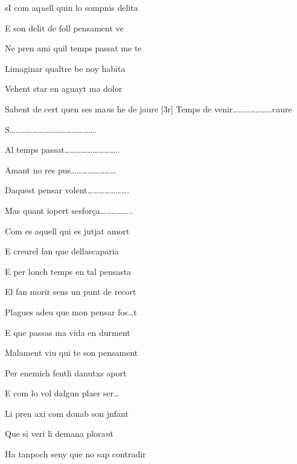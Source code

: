 





\begin{estrofa}

 sI com aq\textit{ue}ll quin lo sompnis delita

 E son delit de foll pensament ve

 Ne pren ami quil temps passat me te

 Limaginar qualtre be noy habita

 Vehent star en aguayt ma dolor

 Sabent de cert quen ses ma\textit{n}s he de jaure
[3r]
 Temps de venir\ldots{}\ldots{}\ldots{}\ldots{}\ldots{}\ldots{}\ldots{}caure

 S\ldots{}\ldots{}\ldots{}\ldots{}\ldots{}\ldots{}\ldots{}\ldots{}\ldots{}\ldots{}\ldots{}\ldots{}\ldots{}\ldots{}\ldots{}.

\end{estrofa}



\begin{estrofa}

 Al temps passat\ldots{}\ldots{}\ldots{}\ldots{}\ldots{}\ldots{}\ldots{}\ldots{}\ldots{}..

 Amant no res pus\ldots{}\ldots{}\ldots{}\ldots{}\ldots{}\ldots{}\ldots{}\ldots{}

 Daquest pensar volent\ldots{}\ldots{}\ldots{}\ldots{}\ldots{}\ldots{}\ldots{}.

 Mas quant iopert sesfor\c{c}a\ldots{}\ldots{}\ldots{}\ldots{}\ldots{}..

 Com es aquell qui es jutjat amort

 E creurel fan que dellascaparia

 E per lonch temps en tal pensasta

 El fan morir sens un punt de recort

\end{estrofa}



\begin{estrofa}

 Plagues adeu que mon pensar fos\ldots{}t

 E que passas ma vida en durment

 Malament viu qui te son pensament

 Per enemich fentli danutxs aport

 E com lo vol dalgun plaer ser\ldots{}

 Li pren axi com donab son jnfant

 Que si veri li demana plora\textit{n}t

 Ha tanpoch seny que no sap contradir

\end{estrofa}



